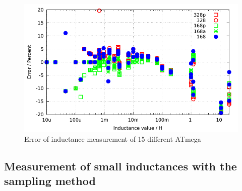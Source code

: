 \begin{figure}[H]
\centering
\includegraphics[width=18cm]{../GNU/induct328p.pdf}
\caption{Error of inductance measurement of 15 different ATmega}
\label{fig:Induct328p}
\end{figure}

\subsection{Measurement of small inductances with the sampling method}

